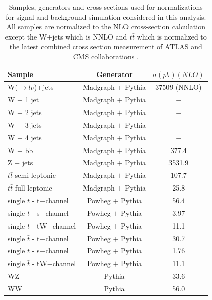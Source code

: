 \begin{table}[h]
  \centering
  \caption{Samples, generators and cross sections used for normalizations for signal and background simulation considered in this analysis. All samples are normalized to the NLO cross-section calculation except the W+jets which is NNLO and $t\bar{t}$ which is normalized to the latest combined cross section measurement of ATLAS and CMS collaborations \cite{CMS:2014gta}. }
  \label{tab:samples}
  \begin{tabular}{ l  c c}
      \hline
      \hline
      	Sample & Generator & $\sigma(pb)(NLO)$ \\
      	\hline
    		W($\rightarrow l \nu$)+jets &  Madgraph + Pythia & $37509$ (NNLO) \\
     	W $+$ 1 jet & Madgraph $+$ Pythia & $-$ \\
     	W $+$ 2 jets & Madgraph $+$ Pythia & $-$ \\
     	W $+$ 3 jets & Madgraph $+$ Pythia & $-$ \\
     	W $+$ 4 jets & Madgraph $+$ Pythia & $-$ \\
     	W $+$ bb & Madgraph $+$ Pythia & 377.4 \\
     	\hline
     	Z $+$ jets & Madgraph $+$ Pythia &  3531.9 \\     	
     	$t\bar{t}$ semi-leptonic & Madgraph $+$ Pythia &  107.7 \\
     	$t\bar{t}$ full-leptonic & Madgraph $+$ Pythia &  25.8 \\
     	\hline
     	single $t$ - t$-$channel & Powheg $+$ Pythia &  56.4 \\
     	single $t$ - s$-$channel & Powheg $+$ Pythia &  3.97 \\
		single $t$ - tW$-$channel & Powheg $+$ Pythia &  11.1 \\
		single $\bar{t}$ - t$-$channel & Powheg $+$ Pythia &  30.7 \\
		single $\bar{t}$ - s$-$channel & Powheg $+$ Pythia &  1.76 \\
		single $\bar{t}$ - tW$-$channel & Powheg $+$ Pythia &  11.1 \\
		\hline
		WZ & Pythia & 33.6 \\
		WW & Pythia & 56.0 \\
      \hline
      \hline 
  \end{tabular}
\end{table}


